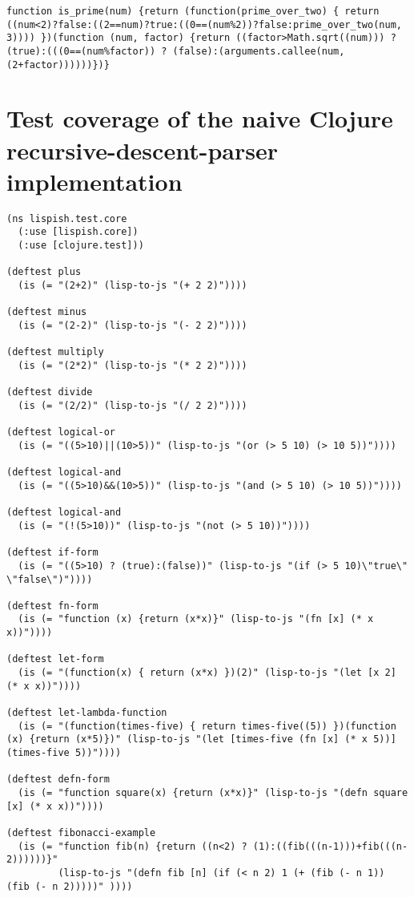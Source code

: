 \begin{verbatim}
function is_prime(num) {return (function(prime_over_two) { return ((num<2)?false:((2==num)?true:((0==(num%2))?false:prime_over_two(num, 3)))) })(function (num, factor) {return ((factor>Math.sqrt((num))) ? (true):(((0==(num%factor)) ? (false):(arguments.callee(num, (2+factor))))))})}
\end{verbatim}

\section{Test coverage of the naive Clojure recursive-descent-parser implementation}\label{tests-appendix}

\begin{verbatim}
(ns lispish.test.core
  (:use [lispish.core])
  (:use [clojure.test]))

(deftest plus
  (is (= "(2+2)" (lisp-to-js "(+ 2 2)"))))

(deftest minus
  (is (= "(2-2)" (lisp-to-js "(- 2 2)"))))

(deftest multiply
  (is (= "(2*2)" (lisp-to-js "(* 2 2)"))))

(deftest divide
  (is (= "(2/2)" (lisp-to-js "(/ 2 2)"))))

(deftest logical-or
  (is (= "((5>10)||(10>5))" (lisp-to-js "(or (> 5 10) (> 10 5))"))))

(deftest logical-and
  (is (= "((5>10)&&(10>5))" (lisp-to-js "(and (> 5 10) (> 10 5))"))))

(deftest logical-and
  (is (= "(!(5>10))" (lisp-to-js "(not (> 5 10))"))))

(deftest if-form
  (is (= "((5>10) ? (true):(false))" (lisp-to-js "(if (> 5 10)\"true\" \"false\")"))))

(deftest fn-form
  (is (= "function (x) {return (x*x)}" (lisp-to-js "(fn [x] (* x x))"))))

(deftest let-form
  (is (= "(function(x) { return (x*x) })(2)" (lisp-to-js "(let [x 2] (* x x))"))))

(deftest let-lambda-function
  (is (= "(function(times-five) { return times-five((5)) })(function (x) {return (x*5)})" (lisp-to-js "(let [times-five (fn [x] (* x 5))] (times-five 5))"))))

(deftest defn-form
  (is (= "function square(x) {return (x*x)}" (lisp-to-js "(defn square [x] (* x x))"))))

(deftest fibonacci-example
  (is (= "function fib(n) {return ((n<2) ? (1):((fib(((n-1)))+fib(((n-2))))))}"
         (lisp-to-js "(defn fib [n] (if (< n 2) 1 (+ (fib (- n 1)) (fib (- n 2)))))" ))))


\end{verbatim}
